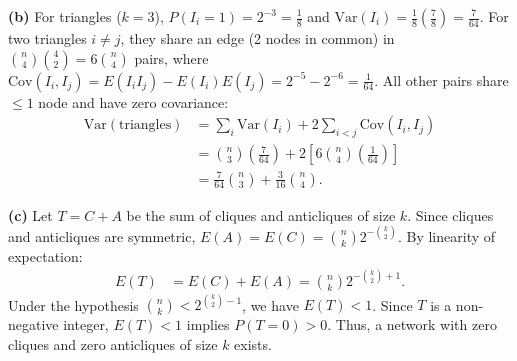 \documentclass[11pt,a4paper]{article}
\begin{document}
\vspace{4pt}
\noindent \textbf{(b)} For triangles ($k = 3$), $P(I_i = 1) = 2^{-3} = \frac{1}{8}$ and $\text{Var}(I_i) = \frac{1}{8}\left(\frac{7}{8}\right) = \frac{7}{64}$. 
For two triangles $i \neq j$, they share an edge (2 nodes in common) in $\binom{n}{4}\binom{4}{2} = 6\binom{n}{4}$ pairs, where $\text{Cov}(I_i, I_j) = E(I_i I_j) - E(I_i)E(I_j) = 2^{-5} - 2^{-6} = \frac{1}{64}$. All other pairs share $\le 1$ node and have zero covariance:
\begin{align*}
\text{Var}(\text{triangles}) &= \sum_{i} \text{Var}(I_i) + 2 \sum_{i < j} \text{Cov}(I_i, I_j) \\
&= \binom{n}{3} \left(\frac{7}{64}\right) + 2\left[6\binom{n}{4}\left(\frac{1}{64}\right)\right] \\
&= \frac{7}{64}\binom{n}{3} + \frac{3}{16}\binom{n}{4}.
\end{align*}

\vspace{4pt}
\noindent \textbf{(c)} Let $T = C + A$ be the sum of cliques and anticliques of size $k$. Since cliques and anticliques are symmetric, $E(A) = E(C) = \binom{n}{k} 2^{-\binom{k}{2}}$. By linearity of expectation:
\begin{align*}
E(T) &= E(C) + E(A) = \binom{n}{k} 2^{-\binom{k}{2} + 1}.
\end{align*}
Under the hypothesis $\binom{n}{k} < 2^{\binom{k}{2}-1}$, we have $E(T) < 1$. Since $T$ is a non-negative integer, $E(T) < 1$ implies $P(T = 0) > 0$. Thus, a network with zero cliques and zero anticliques of size $k$ exists.
\end{document}
